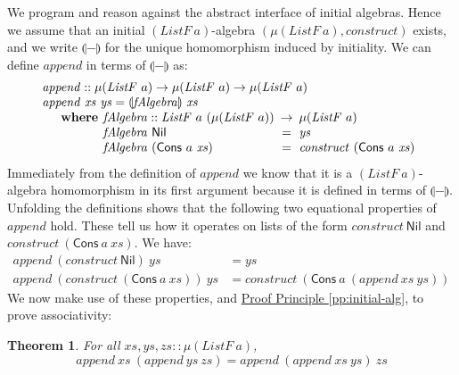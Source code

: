 \documentclass{jfp1}
\newcommand{\fold}[1]{\llparenthesis #1 \rrparenthesis}
\newtheorem{theorem}{Theorem}
\newcommand{\proofprinref}[1]{\hyperref[#1]{Proof Principle \ref*{#1}}}
\newcommand{\kw}[1]{\textbf{#1}}
\begin{document}
We program and reason against the abstract interface of initial
algebras. Hence we assume that an initial $(\mathit{ListF}~a)$-algebra
$(\mu(\mathit{ListF}~a), \mathit{construct})$ exists, and we write
$\fold{-}$ for the unique homomorphism induced by initiality. We can
define $\mathit{append}$ in terms of $\fold{-}$ as:
\begin{displaymath}
  \begin{array}{l}
    \mathit{append} :: \mu(\mathit{ListF}~a) \to \mu(\mathit{ListF}~a) \to \mu(\mathit{ListF}~a) \\
    \mathit{append}~\mathit{xs}~\mathit{ys} = \fold{\mathit{fAlgebra}}~\mathit{xs} \\
    \quad\begin{array}{r@{\hspace{0.4em}}l@{\hspace{0.5em}}c@{\hspace{0.5em}}l}
      \kw{where} & \mathit{fAlgebra} :: \mathit{ListF}~a~(\mu(\mathit{ListF}~a)) &\to& \mu(\mathit{ListF}~a) \\
      & \mathit{fAlgebra}~\mathsf{Nil} &=& \mathit{ys} \\
      & \mathit{fAlgebra}~(\mathsf{Cons}~a~\mathit{xs}) &=& \mathit{construct}~(\mathsf{Cons}~a~\mathit{xs})
    \end{array}
  \end{array}
\end{displaymath}
Immediately from the definition of $\mathit{append}$ we know that it
is a $(\mathit{ListF}~a)$-algebra homomorphism in its first argument
because it is defined in terms of $\fold{-}$. Unfolding the
definitions shows that the following two equational properties of
$\mathit{append}$ hold. These tell us how it operates on lists of the
form $\mathit{construct}~\mathsf{Nil}$ and
$\mathit{construct}~(\mathsf{Cons}~a~\mathit{xs})$. We have:
\begin{align}
  \label{eq:append-nil}
  \mathit{append}~(\mathit{construct}~\mathsf{Nil})~\mathit{ys} & = \mathit{ys} \\
  \label{eq:append-cons}
  \mathit{append}~(\mathit{construct}~(\mathsf{Cons}~a~\mathit{xs}))~\mathit{ys} & = \mathit{construct}~(\mathsf{Cons}~a~(\mathit{append}~\mathit{xs}~\mathit{ys}))
\end{align}
We now make use of these properties, and
\proofprinref{pp:initial-alg}, to prove associativity:

\begin{theorem}\label{thm:append-assoc}
  For all $\mathit{xs}, \mathit{ys}, \mathit{zs} :: \mu(\mathit{ListF}~a)$,
  \begin{displaymath}
    \mathit{append}~\mathit{xs}~(\mathit{append}~\mathit{ys}~\mathit{zs}) = \mathit{append}~(\mathit{append}~\mathit{xs}~\mathit{ys})~\mathit{zs}
  \end{displaymath}
\end{theorem}
\end{document}
